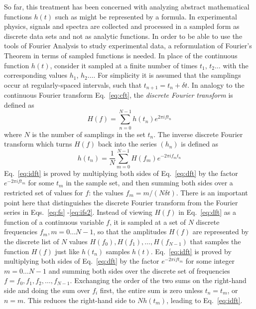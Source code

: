 \documentclass{revtex4}
\begin{document}
So far, this treatment has been concerned with analyzing abstract
mathematical functions $h(t)$ such as might be represented by a formula.
In experimental physics, signals and spectra are collected and processed
in a sampled form as discrete data sets and not as analytic functions.
In order to be able to use the tools of Fourier Analysis to study
experimental data, a reformulation of Fourier's Theorem in terms of
sampled functions is needed.  In place of the continuous function $h(t)$,
consider it sampled at a finite number of times $t_1$, $t_2\ldots$ with
the corresponding values $h_1$, $h_2\ldots$.  For simplicity it is assumed
that the samplings occur at regularly-spaced intervals, such that
$t_{n+1} = t_n + \delta t$.  In analogy to the continuous Fourier transform
Eq.~\ref{eq:cft}, the {\em discrete Fourier transform} is defined as
\begin{equation}
H(f) = \sum_{n=0}^{N-1}h(t_n)e^{2\pi ift_n}
\label{eq:dft}
\end{equation}
where $N$ is the number of samplings in the set ${t_n}$.
The inverse discrete Fourier transform which turns $H(f)$ back into the
series $(h_n)$ is defined as
\begin{equation}
h(t_n) = \frac{1}{N}\sum_{m=0}^{N-1}H(f_m)e^{-2\pi if_mt_n}
\label{eq:idft}
\end{equation}
Eq.~\ref{eq:idft} is proved by multiplying both sides of Eq.~\ref{eq:dft} by
the factor $e^{-2\pi i f t_m}$ for some $t_m$ in the sample set, and then
summing both sides over a restricted set of values for $f$: the values
$f_m = m/(N\delta t)$.  There is an important point here that distinguishes
the discrete Fourier transform from the Fourier series in Eqs.~\ref{eq:fs}
-\ref{eq:ifs2}.  Instead of viewing $H(f)$ in Eq.~\ref{eq:dft} as a function
of a continuous variable $f$, it is sampled at a set of $N$ discrete
frequencies $f_m, m=0\ldots N-1$, so that the amplitudes $H(f)$ are
represented by the discrete list of $N$ values $H(f_0),H(f_1),\ldots,H(f_{N-1})$
that samples the function $H(f)$ just like $h(t_n)$ samples $h(t)$.
Eq.~\ref{eq:idft} is proved by multiplying both sides of Eq.~\ref{eq:dft}
by the factor $e^{-2\pi ift_m}$ for some integer $m=0\ldots N-1$ and summing
both sides over the discrete set of frequencies $f=f_0,f_1,f_2,\ldots,f_{N-1}$.
Exchanging the order of the two sums on the right-hand side and doing the
sum over $f_i$ first, the entire sum is zero unless $t_n=t_m$, or $n=m$.
This reduces the right-hand side to $N h(t_m)$, leading to Eq.~\ref{eq:idft}.
\end{document}
